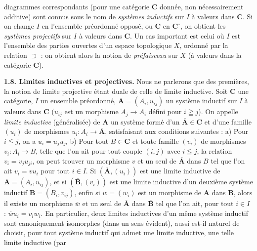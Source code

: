 
\noindent diagrammes correspondants (pour une catégorie $\mathbf{C}$ donnée, non
nécessairement additive) sont connus sous le nom de \textit{systèmes
inductifs} sur $I$ à valeurs dans $\mathbf{C}$. Si on change $I$ en l'ensemble
préordonné opposé, ou $\mathbf{C}$ en $\mathbf{C}^\circ$, on obtient les \textit{systèmes
projectifs} sur $I$ à valeurs dans $\mathbf{C}$. Un cas important est celui où $I$ est
l'ensemble des parties ouvertes d'un espace topologique $X$, ordonné par la
relation $\supset$ : on obtient alors la notion de \textit{préfaisceau} sur
$X$ (à valeurs dans la catégorie $\mathbf{C}$).

\textbf{1.8. Limites inductives et projectives.} Nous ne parlerons
que des premières, la notion de limite projective étant duale de celle de
limite inductive. Soit $\mathbf{C}$ une catégorie, $I$ un ensemble préordonné,
$\mathbf A=(A_i,u_{ij})$ un système inductif sur $I$ à valeurs dans $\mathbf{C}$
($u_{ij}$ est un morphisme $A_j\to A_i$ défini pour $i\geqq j$).
On appelle \textit{limite inductive} (généralisée) de $\mathbf A$ un système
formé d'un $\overline{\mathbf A}\in \mathbf{C}$ et d'une famille $(u_i)$ de morphismes
$u_i:A_i\to\overline{\mathbf A}$, satisfaisant aux conditions suivantes :
a) Pour $i\leqq j$, on a $u_i=u_j u_{ji}$ b) Pour tout $B\in \mathbf{C}$ et toute
famille $(v_i)$ de morphismes $v_i:A_i\to B$, telle que l'on ait
pour tout couple $(i,j)$ avec $i\leqq j$, la relation $v_i=v_j u_{ji}$, on peut
trouver un morphisme $v$ et un seul de $\overline{\mathbf A}$ dans $B$ tel que l'on ait
$v_i=v u_i$ pour tout $i\in I$.
Si $(\overline{\mathbf A},(u_i))$ est une limite inductive de
$\mathbf A=(A_i,u_{ij})$, et si $(\overline{\mathbf B},(v_i))$ est une limite inductive
d'un deuxième système inductif $\mathbf B=(B_i,v_{ij})$, enfin si
$w=(w_i)$ est un morphisme de $\mathbf A$ dans $\mathbf B$, alors il existe un
morphisme $\overline w$ et un seul de $\overline{\mathbf A}$ dans $\overline{\mathbf B}$ tel que
l'on ait, pour tout $i\in I$ : $\overline w u_i=v_iw_i$. En particulier, deux
limites inductives d'un même système inductif sont canoniquement isomorphes
(dans un sens évident), aussi est-il naturel de choisir, pour tout système
inductif qui admet une limite inductive, une telle limite inductive (par
